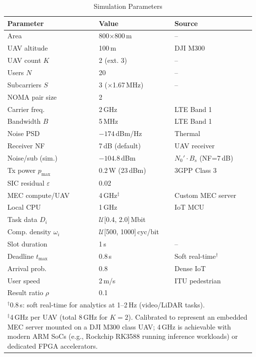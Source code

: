 \documentclass[journal]{IEEEtran}
\begin{document}
\begin{table}[t]
\centering
\caption{Simulation Parameters}
\label{tab:params}
\begin{tabular}{lll}
\toprule
\textbf{Parameter} & \textbf{Value} & \textbf{Source} \\
\midrule
Area & 800$\times$800\,m & -- \\
UAV altitude & 100\,m & DJI M300 \\
UAV count $K$ & 2 (ext. 3) & -- \\
Users $N$ & 20 & -- \\
Subcarriers $S$ & 3 ($\times$1.67\,MHz) & -- \\
NOMA pair size & 2 & \cite{saito2013non} \\
Carrier freq. & 2\,GHz & LTE Band 1 \\
Bandwidth $B$ & 5\,MHz & LTE Band 1 \\
Noise PSD & $-174$\,dBm/Hz & Thermal \\
Receiver NF & 7\,dB (default) & UAV receiver \\
Noise/sub (sim.) & $-104.8$\,dBm & $N_0'\cdot B_s$ (NF=7\,dB) \\
Tx power $p_{\max}$ & 0.2\,W (23\,dBm) & 3GPP Class 3 \\
SIC residual $\varepsilon$ & 0.02 & \cite{ding2019impact} \\
MEC compute/UAV & 4\,GHz$^\ddagger$ & Custom MEC server \\
Local CPU & 1\,GHz & IoT MCU \\
Task data $D_i$ & $\mathcal{U}$[0.4, 2.0]\,Mbit & \cite{mao2017survey} \\
Comp. density $\omega_i$ & $\mathcal{U}$[500, 1000]\,cyc/bit & \cite{mao2017survey} \\
Slot duration & 1\,s & -- \\
Deadline $t_{\max}$ & 0.8\,s & Soft real-time$^\dagger$ \\
Arrival prob. & 0.8 & Dense IoT \\
User speed & 2\,m/s & ITU pedestrian \\
Result ratio $\rho$ & 0.1 & \cite{mao2017survey} \\
\bottomrule
\multicolumn{3}{l}{\scriptsize $^\dagger$0.8\,s: soft real-time for analytics at 1--2\,Hz (video/LiDAR tasks).} \\
\multicolumn{3}{p{0.85\columnwidth}}{\scriptsize $^\ddagger$4\,GHz per UAV (total 8\,GHz for $K=2$). Calibrated to represent an embedded MEC server mounted on a DJI M300 class UAV; 4\,GHz is achievable with modern ARM SoCs (e.g., Rockchip RK3588 running inference workloads) or dedicated FPGA accelerators.}
\end{tabular}
\end{table}
\end{document}
